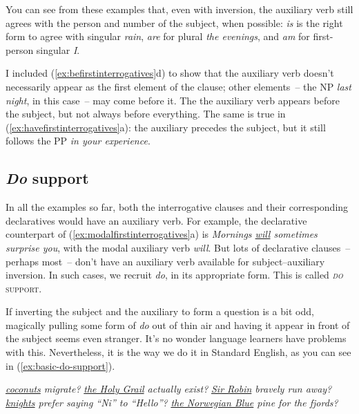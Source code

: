 You can see from these examples that, even with inversion, the auxiliary verb still agrees with the person and number of the subject, when possible: \textit{is} is the right form to agree with singular \textit{rain}, \textit{are} for plural \textit{the evenings}, and \textit{am} for first-person singular \textit{I}. 

I included (\ref{ex:befirstinterrogatives}d) to show that the auxiliary verb doesn't necessarily appear as the first element of the clause; other elements~-- the NP \textit{last night}, in this case~-- may come before it. The the auxiliary verb appears before the subject, but not always before everything. The same is true in (\ref{ex:havefirstinterrogatives}a): the auxiliary precedes the subject, but it still follows the PP \textit{in your experience}.


\subsection{\textit{Do} support}\label{sec:basic-do-support}

In all the examples so far, both the interrogative clauses and their corresponding declaratives would have an auxiliary verb. For example, the declarative counterpart of (\ref{ex:modalfirstinterrogatives}a) is \textit{Mornings \uline{will} {\op}sometimes{\cp} surprise you}, with the modal auxiliary verb \textit{will}. But lots of declarative clauses~-- perhaps most~-- don't have an auxiliary verb available for subject--auxiliary inversion. In such cases, we recruit \textit{do}, in its appropriate form. This is called \textsc{\textit{do} support}.

If inverting the subject and the auxiliary to form a question is a bit odd, magically pulling some form of \textit{do} out of thin air and having it appear in front of the subject seems even stranger. It's no wonder language learners have problems with this. Nevertheless, it is the way we do it in Standard English, as you can see in (\ref{ex:basic-do-support}).

\ea \label{ex:basic-do-support}
    \ea \textit{ \uline{coconuts} migrate?}
        \ex \textit{ \uline{the Holy Grail} actually exist?}
        \ex \textit{ \uline{Sir Robin} bravely run away?}
        \ex \textit{ \uline{knights} prefer saying ``Ni'' to ``Hello''?}
        \ex \textit{ \uline{the Norwegian Blue} pine for the fjords?}
    \z
\z

